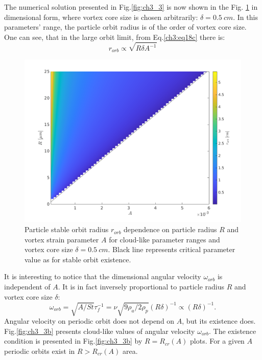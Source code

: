 \documentclass[../main.tex]{subfiles}
\begin{document}
 The numerical solution presented in Fig.\ref{fig:ch3_3} is now shown in the Fig. \ref{fig:ch3_3a} in dimensional form, where vortex core size is chosen arbitrarily: $\delta=0.5~cm$. In this parameters' range, the particle orbit radius is of the order of vortex core size. One can see, that in the large orbit limit, from Eq.\ref {ch3:eq18c} there is:
\begin{equation}
r_{orb}\propto \sqrt{R \delta A^{-1}}
\label{ch3:eq19b}
\end{equation}

\begin{figure}
\centering
\noindent \includegraphics[width=30pc]{gfx/orbit_vs_R_A_delta05cm.png}
\caption{Particle stable orbit radius $r_{orb}$ dependence on  particle radius $R$ and vortex strain parameter $A$ for cloud-like parameter ranges and vortex core size $\delta=0.5~cm$. Black line represents critical parameter value as for stable orbit existence.}
\label{fig:ch3_3a}
\end{figure}

It is interesting to notice that the dimensional angular velocity $\omega_{orb}$ is independent of $A$. It is in fact inversely proportional to particle radius $R$ and vortex core size $\delta$:
\begin{equation}
\omega_{orb}=\sqrt{A/St} \tau_f^{-1}=\nu \sqrt{9 \rho_a /2 \rho_p} (R \delta)^{-1} \propto (R \delta)^{-1}.
\label{ch3:eq20}
\end{equation}
Angular velocity on periodic orbit does not depend on $A$, but its existence does. Fig.\ref{fig:ch3_3b} presents cloud-like values of angular velocity $\omega_{orb}$. The existence condition is presented in Fig.\ref{fig:ch3_3b} by $R=R_{cr}(A)$ plots. For a given $A$ periodic orbits exist in  $R>R_{cr}(A)$ area.
\end{document}
